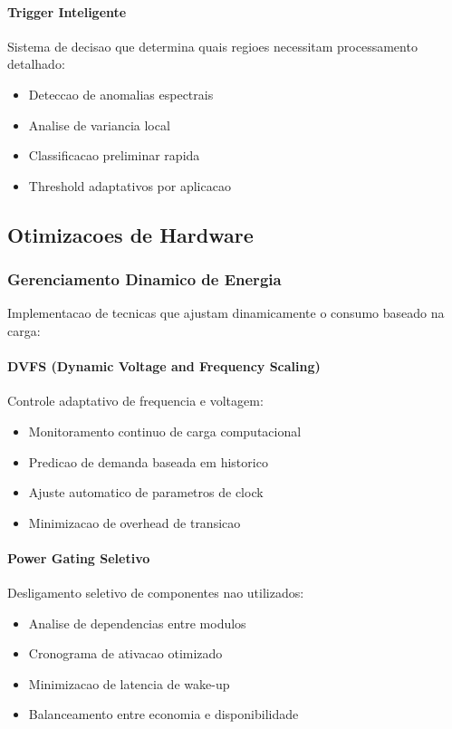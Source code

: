 \paragraph{Trigger Inteligente}
Sistema de decisao que determina quais regioes necessitam processamento detalhado:
\begin{itemize}
    \item Deteccao de anomalias espectrais
    \item Analise de variancia local
    \item Classificacao preliminar rapida
    \item Threshold adaptativos por aplicacao
\end{itemize}

\subsection{Otimizacoes de Hardware}

\subsubsection{Gerenciamento Dinamico de Energia}
Implementacao de tecnicas que ajustam dinamicamente o consumo baseado na carga:

\paragraph{DVFS (Dynamic Voltage and Frequency Scaling)}
Controle adaptativo de frequencia e voltagem:
\begin{itemize}
    \item Monitoramento continuo de carga computacional
    \item Predicao de demanda baseada em historico
    \item Ajuste automatico de parametros de clock
    \item Minimizacao de overhead de transicao
\end{itemize}

\paragraph{Power Gating Seletivo}
Desligamento seletivo de componentes nao utilizados:
\begin{itemize}
    \item Analise de dependencias entre modulos
    \item Cronograma de ativacao otimizado
    \item Minimizacao de latencia de wake-up
    \item Balanceamento entre economia e disponibilidade
\end{itemize}

